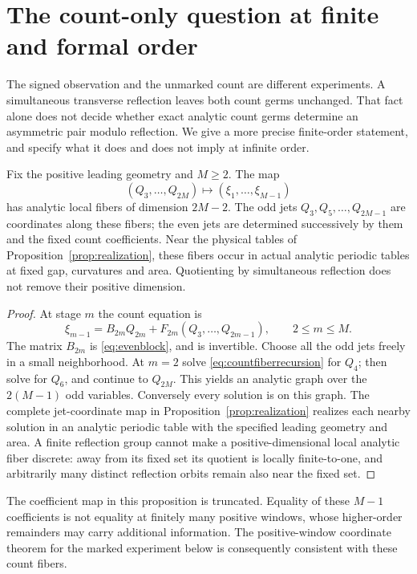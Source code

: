 \section{The count-only question at finite and formal order}
\label{sec:countfibers}
The signed observation and the unmarked count are different experiments.
A simultaneous transverse reflection leaves both count germs unchanged.
That fact alone does not decide whether exact analytic count germs
determine an asymmetric pair modulo reflection. We give a more precise
finite-order statement, and specify what it does and does not imply at
infinite order.

\begin{proposition}\label{prop:countfibers}
Fix the positive leading geometry and $M\ge2$. The map
\[
 (Q_3,\ldots,Q_{2M})\longmapsto(\xi_1,\ldots,\xi_{M-1})
\]
has analytic local fibers of dimension $2M-2$. The odd jets
$Q_3,Q_5,\ldots,Q_{2M-1}$ are coordinates along these fibers; the
even jets are determined successively by them and the fixed count
coefficients. Near the physical tables of Proposition~\ref{prop:realization},
these fibers occur in actual analytic periodic tables at fixed gap,
curvatures and area. Quotienting by simultaneous reflection does not
remove their positive dimension.
\end{proposition}
\begin{proof}
At stage $m$ the count equation is
\begin{equation}\label{eq:countfiberrecursion}
 \xi_{m-1}=B_{2m}Q_{2m}
             +F_{2m}(Q_3,\ldots,Q_{2m-1}),\qquad 2\le m\le M.
\end{equation}
The matrix $B_{2m}$ is \eqref{eq:evenblock}, and is invertible.
Choose all the odd jets freely in a small neighborhood. At $m=2$
solve \eqref{eq:countfiberrecursion} for $Q_4$; then solve for $Q_6$,
and continue to $Q_{2M}$. This yields an analytic graph over the
$2(M-1)$ odd variables. Conversely every solution is on this graph.
The complete jet-coordinate map in Proposition~\ref{prop:realization}
realizes each nearby solution in an analytic periodic table with the
specified leading geometry and area. A finite reflection group cannot
make a positive-dimensional local analytic fiber discrete: away from
its fixed set its quotient is locally finite-to-one, and arbitrarily
many distinct reflection orbits remain also near the fixed set.
\end{proof}

The coefficient map in this proposition is truncated. Equality of these
$M-1$ coefficients is not equality at finitely many positive windows,
whose higher-order remainders may carry additional information.
The positive-window coordinate theorem for the marked experiment below
is consequently consistent with these count fibers.

